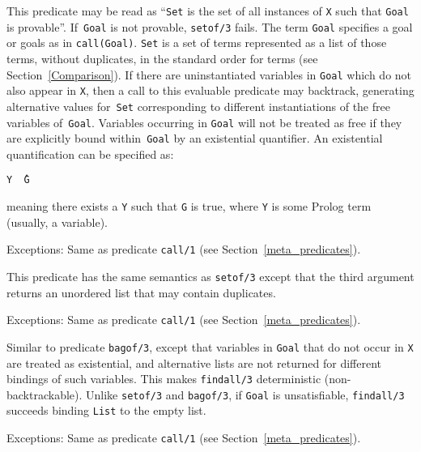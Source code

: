 \begin{description}
    This predicate may be read as ``{\tt Set} is the set of all instances 
    of {\tt X} such that {\tt Goal} is provable''.
    If~{\tt Goal} is not provable, {\tt setof/3} fails.
    The term {\tt Goal} specifies a goal or goals as in {\tt call(Goal)}.
    {\tt Set} is a set of terms represented as a list of those terms,
    without duplicates, in the standard order for terms 
    (see Section~\ref{Comparison}).
    If there are uninstantiated variables in {\tt Goal} which do not also 
    appear in {\tt X}, then a call to this evaluable predicate may backtrack,
    generating alternative values for~{\tt Set} corresponding to different
    instantiations of the free variables of~{\tt Goal}.
    Variables occurring in {\tt Goal} will not be treated as free if they 
    are explicitly bound within~{\tt Goal} by an existential quantifier.
    An existential quantification can be specified as:
    \begin{center}
    {\tt Y \^\ G}\index{\^}
    \end{center}
    meaning there exists a {\tt Y} such that {\tt G} is true,
    where {\tt Y} is some Prolog term (usually, a variable).
  
    Exceptions: Same as predicate {\tt call/1}
		(see Section~\ref{meta_predicates}).

 
    This predicate has the same semantics as {\tt setof/3} except that the 
    third argument returns an unordered list that may contain duplicates.

    Exceptions: Same as predicate {\tt call/1}
		(see Section~\ref{meta_predicates}).

 
    Similar to predicate {\tt bagof/3}, except that variables in {\tt Goal}
    that do not occur in {\tt X} are treated as existential, and alternative
    lists are not returned for different bindings of such variables.  This
    makes {\tt findall/3} deterministic (non-backtrackable).  Unlike
    {\tt setof/3} and {\tt bagof/3}, if {\tt Goal} is unsatisfiable,
    {\tt findall/3} succeeds binding {\tt List} to the empty list.

    Exceptions: Same as predicate {\tt call/1}
		(see Section~\ref{meta_predicates}).

\label{tfindall/3}


\end{description}
